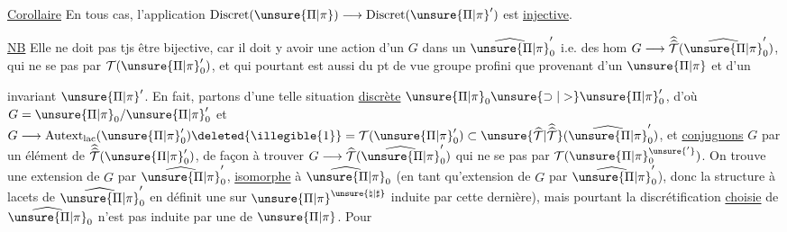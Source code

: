 \uline{Corollaire} En tous cas, l'application
\(\mathrm{Discret}(\unsure{\Pi|\pi})\longrightarrow\mathrm{Discret}(\unsure{\Pi|\pi}')\)
est \uline{injective}.

\uline{NB} Elle ne doit pas tjs être bijective,
car il doit y avoir une action  d'un
\(G\) dans un \(\widehat{\unsure{\Pi|\pi}}'_0\) i.e. des hom
\(G\longrightarrow\widehat{\widehat{\mathcal T}}(\widehat{\unsure{\Pi|\pi}}'_0)\), qui ne se  pas
par \(\mathcal T(\unsure{\Pi|\pi}'_0)\), et qui pourtant est aussi
 du pt de vue groupe profini que
 provenant d'un \(\unsure{\Pi|\pi}\) et d'un 


invariant $\unsure{\Pi|\pi}'$. En fait, partons d'une telle situation \uline{discrète} $\unsure{\Pi|\pi}_0 \unsure{\supset|>} \unsure{\Pi|\pi}'_0$, d'où $G=\unsure{\Pi|\pi}_0/\unsure{\Pi|\pi}'_0$ et $G\longrightarrow \operatorname{Autext}_{\mathrm{lac}}(\unsure{\Pi|\pi}'_0)\deleted{\illegible{1}}=\mathcal T(\unsure{\Pi|\pi}'_0)\subset\unsure{\widehat{\mathcal T}|\widehat{\widehat{\mathcal T}}}(\widehat{\unsure{\Pi|\pi}}'_0)$, et \uline{conjuguons} $G$ par un élément \inserted{$\gamma$} de $\widehat{\widehat{\mathcal T}}(\unsure{\Pi|\pi}'_0)$, de façon à trouver $G\longrightarrow\widehat{\mathcal T}(\widehat{\unsure{\Pi|\pi}}'_0)$ qui ne  se  pas par $\mathcal T(\unsure{\Pi|\pi}^{\unsure{'}}_0)$. On trouve une extension \inserted{$\unsure{\widehat{\unsure{\Pi|\pi}}|\unsure{\Pi|\pi}}^{\unsure{\natural|\sharp}}$} de $G$ par $\widehat{\unsure{\Pi|\pi}}'_0$, \uline{isomorphe} à $\widehat{\unsure{\Pi|\pi}}_0$ (en tant qu'extension de $G$ par $\widehat{\unsure{\Pi|\pi}}'_0$), donc la structure à lacets de $\widehat{\unsure{\Pi|\pi}}'_0$ en définit une sur $\unsure{\Pi|\pi}^{\unsure{\natural|\sharp}}$   induite par cette dernière), mais pourtant la discrétification \uline{choisie}  de $\widehat{\unsure{\Pi|\pi}}_0$ n'est pas induite par une de $\unsure{\Pi|\pi}$. Pour

